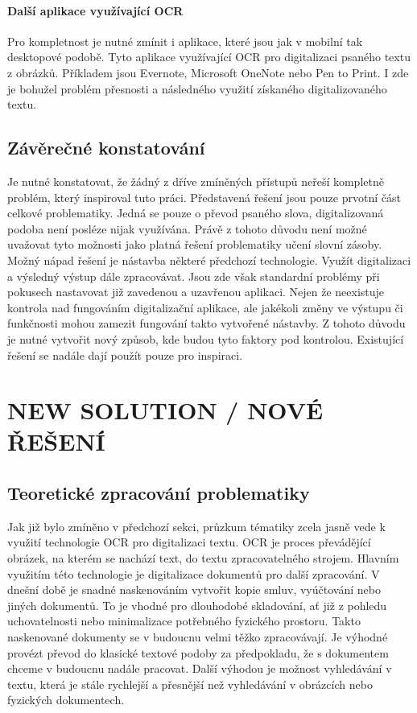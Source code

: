 \documentclass[journal]{IEEEtran}
\begin{document}
\paragraph{Další aplikace využívající OCR}
Pro kompletnost je nutné zmínit i aplikace, které jsou jak v mobilní tak desktopové podobě.
Tyto aplikace využívající \ac{OCR} pro digitalizaci psaného textu z obrázků.
Příkladem jsou Evernote\cite{evernote}, Microsoft OneNote\cite{onenote} nebo Pen to Print\cite{pen_to_print}.
I zde je bohužel problém přesnosti a následného využití získaného digitalizovaného textu.


\subsection{Závěrečné konstatování}
Je nutné konstatovat, že žádný z dříve zmíněných přístupů neřeší kompletně problém, který inspiroval tuto práci.
Představená řešení jsou pouze prvotní část celkové problematiky.
Jedná se pouze o převod psaného slova, digitalizovaná podoba není posléze nijak využívána.
Právě z tohoto důvodu není možné uvažovat tyto možnosti jako platná řešení problematiky učení slovní zásoby.
Možný nápad řešení je nástavba některé předchozí technologie.
Využít digitalizaci a výsledný výstup dále zpracovávat.
Jsou zde však standardní problémy při pokusech nastavovat již zavedenou a uzavřenou aplikaci.
Nejen že neexistuje kontrola nad fungováním digitalizační aplikace, ale jakékoli změny ve výstupu či funkčnosti mohou zamezit fungování takto vytvořené nástavby.
Z tohoto důvodu je nutné vytvořit nový způsob, kde budou tyto faktory pod kontrolou.
Existující řešení se nadále dají použít pouze pro inspiraci.

\section{NEW SOLUTION / NOVÉ ŘEŠENÍ}

\subsection{Teoretické zpracování problematiky}
Jak již bylo zmíněno v předchozí sekci, průzkum tématiky zcela jasně vede k využití technologie \ac{OCR} pro digitalizaci textu.
\ac{OCR} je proces převádějící obrázek, na kterém se nachází text, do textu zpracovatelného strojem.
Hlavním využitím této technologie je digitalizace dokumentů pro další zpracování.
V dnešní době je snadné naskenováním vytvořit kopie smluv, vyúčtování nebo jiných dokumentů.
To je vhodné pro dlouhodobé skladování, ať již z pohledu uchovatelnosti nebo minimalizace potřebného fyzického prostoru.
Takto naskenované dokumenty se v budoucnu velmi těžko zpracovávají.
Je výhodné provézt převod do klasické textové podoby za předpokladu, že s dokumentem chceme v budoucnu nadále pracovat.
Další výhodou je možnost vyhledávání v textu, která je stále rychlejší a přesnější než vyhledávání v obrázcích nebo fyzických dokumentech.\cite{amazon_ocr}
\end{document}
